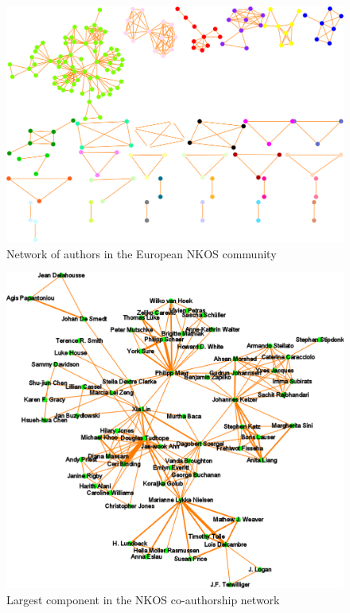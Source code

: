 \documentclass[runningheads,a4paper]{llncs}
\begin{document}
\begin{figure}
	\centering
	\includegraphics[width=1.0\linewidth]{wholeNet}
	\vspace{-0.5em}
	\caption{Network of authors in the European NKOS community}
	\label{fig:wholenet}
	\vspace{-0.5em}
\end{figure}

\begin{figure}
	\centering
	\includegraphics[width=0.9\linewidth]{largestComponent}
	\caption{Largest component in the NKOS co-authorship network}
	\label{fig:largestComponent}
\end{figure}
\end{document}
